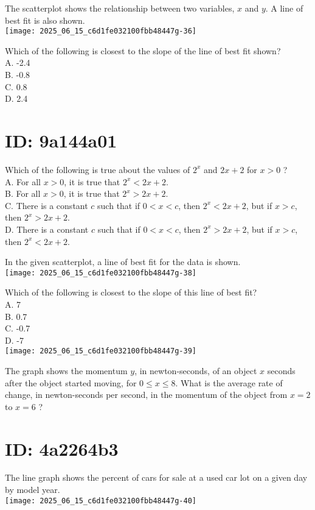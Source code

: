 The scatterplot shows the relationship between two variables, $x$ and $y$. A line of best fit is also shown.\\
\texttt{[image: 2025\_06\_15\_c6d1fe032100fbb48447g-36]}

Which of the following is closest to the slope of the line of best fit shown?\\
A. -2.4\\
B. -0.8\\
C. 0.8\\
D. 2.4

\section*{ID: 9a144a01}
Which of the following is true about the values of $2^{x}$ and $2 x+2$ for $x>0$ ?\\
A. For all $x>0$, it is true that $2^{x}<2 x+2$.\\
B. For all $x>0$, it is true that $2^{x}>2 x+2$.\\
C. There is a constant $c$ such that if $0<x<c$, then $2^{x}<2 x+2$, but if $x>c$, then $2^{x}>2 x+2$.\\
D. There is a constant $c$ such that if $0<x<c$, then $2^{x}>2 x+2$, but if $x>c$, then $2^{x}<2 x+2$.

In the given scatterplot, a line of best fit for the data is shown.\\
\texttt{[image: 2025\_06\_15\_c6d1fe032100fbb48447g-38]}

Which of the following is closest to the slope of this line of best fit?\\
A. 7\\
B. 0.7\\
C. -0.7\\
D. -7\\
\texttt{[image: 2025\_06\_15\_c6d1fe032100fbb48447g-39]}

The graph shows the momentum $y$, in newton-seconds, of an object $x$ seconds after the object started moving, for $0 \leq x \leq 8$. What is the average rate of change, in newton-seconds per second, in the momentum of the object from $x=2$ to $x=6$ ?

\section*{ID: 4a2264b3}
The line graph shows the percent of cars for sale at a used car lot on a given day by model year.\\
\texttt{[image: 2025\_06\_15\_c6d1fe032100fbb48447g-40]}

